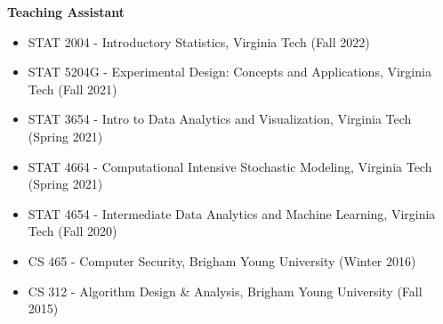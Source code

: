 \documentclass[margin,line]{res}
\begin{document}
\begin{resume}
{\bf Teaching Assistant}
\begin{itemize}
\itemsep -0.9pt
\item {\sc STAT 2004} - Introductory Statistics, {\sc Virginia Tech} (Fall 2022)
\item {\sc STAT 5204G} - Experimental Design: Concepts and Applications, {\sc Virginia Tech} (Fall 2021)
\item {\sc STAT 3654} - Intro to Data Analytics and Visualization, {\sc Virginia Tech} (Spring 2021)
\item {\sc STAT 4664} - Computational Intensive Stochastic Modeling, {\sc Virginia Tech} (Spring 2021)
\item {\sc STAT 4654} - Intermediate Data Analytics and Machine Learning, {\sc Virginia Tech} (Fall 2020)
\item {\sc CS 465} - Computer Security, {\sc Brigham Young University} (Winter 2016)
\item {\sc CS 312} - Algorithm Design \& Analysis, {\sc Brigham Young University} (Fall 2015)
\end{itemize}


\end{resume}
\end{document}
